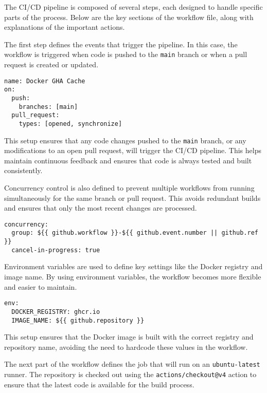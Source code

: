 The CI/CD pipeline is composed of several steps, each designed to handle specific
parts of the process. Below are the key sections of the workflow file, along with
explanations of the important actions.

The first step defines the events that trigger the pipeline. In this case, the
workflow is triggered when code is pushed to the \texttt{main} branch or when a
pull request is created or updated.

\begin{lstlisting}[caption={Triggering Events}]
name: Docker GHA Cache
on:
  push:
    branches: [main]
  pull_request:
    types: [opened, synchronize]
\end{lstlisting}

This setup ensures that any code changes pushed to the \texttt{main} branch, or any
modifications to an open pull request, will trigger the CI/CD pipeline. This helps
maintain continuous feedback and ensures that code is always tested and built
consistently.

Concurrency control is also defined to prevent multiple workflows from running
simultaneously for the same branch or pull request. This avoids redundant builds and
ensures that only the most recent changes are processed.

\begin{lstlisting}[caption={Concurrency Settings}]
concurrency:
  group: ${{ github.workflow }}-${{ github.event.number || github.ref }}
  cancel-in-progress: true
\end{lstlisting}

Environment variables are used to define key settings like the Docker registry and
image name. By using environment variables, the workflow becomes more flexible and
easier to maintain.

\begin{lstlisting}[caption={Environment Variables}]
env:
  DOCKER_REGISTRY: ghcr.io
  IMAGE_NAME: ${{ github.repository }}
\end{lstlisting}

This setup ensures that the Docker image is built with the correct registry and
repository name, avoiding the need to hardcode these values in the workflow.

The next part of the workflow defines the job that will run on an
\texttt{ubuntu-latest} runner. The repository is checked out using the
\texttt{actions/checkout@v4} action to ensure that the latest code is available for
the build process.


